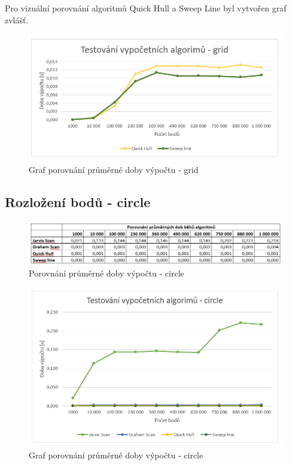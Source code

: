 \documentclass[a4paper, 12pt]{article}
\begin{document}
Pro vizuální porovnání algoritmů Quick Hull a Sweep Line byl vytvořen graf zvlášť.
\begin{figure}[h!]
	\centering
	\includegraphics[width=12cm]{g2_grid.jpg}
	\caption{Graf porovnání průměrné doby výpočtu - grid}
\end{figure}
\subsection {Rozložení bodů - circle}

\begin{figure}[h!]
	\centering
	\includegraphics[width=15cm]{circle.jpg}
	\caption{Porovnání průměrné doby výpočtu - circle}
\end{figure}


\begin{figure}[h!]
	\centering
	\includegraphics[width=12cm]{g1_circle.jpg}
	\caption{Graf porovnání průměrné doby výpočtu - circle}
\end{figure}
\clearpage
\end{document}
